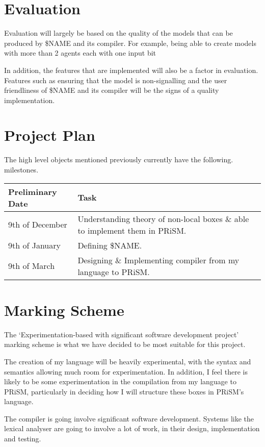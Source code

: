 \documentclass[11pt, a4paper]{article}
\begin{document}
\section{Evaluation} %
\label{sec:evaluation}

Evaluation will largely be based on the quality of the models that can be
produced by \$NAME and its compiler. For example, being able to create models
with more than 2 agents each with one input bit 

In addition, the features that are implemented will also be a factor in
evaluation. Features such as ensuring that the model is non-signalling and
the user friendliness of \$NAME and its compiler will be the signs of a quality 
implementation.


\section{Project Plan} %
\label{sec:project_plan}
The high level objects mentioned previously currently have the following.
milestones.

\begin{center}
    \begin{tabular}{l | p{7.5cm}}
        Preliminary Date & Task \\
        \hline
        9th of December & Understanding theory of non-local boxes \& able to
        implement them in PRiSM. \\

        9th of January & Defining \$NAME. \\

        9th of March & Designing \& Implementing compiler from my language to
        PRiSM. \\
\end{tabular}
\end{center}


\section{Marking Scheme} %
\label{sec:marking_scheme}
The `Experimentation-based with significant software development project'
marking scheme is what we have decided to be most suitable for this project.

The creation of my language will be heavily experimental, with the syntax and
semantics allowing much room for experimentation. In addition, I feel there is
likely to be some experimentation in the compilation from my language to PRiSM,
particularly in deciding how I will structure these boxes in PRiSM's language.

The compiler is going involve significant software development. Systems like the
lexical analyser are going to involve a lot of work, in their design,
implementation and testing. 

\newpage


\end{document}
